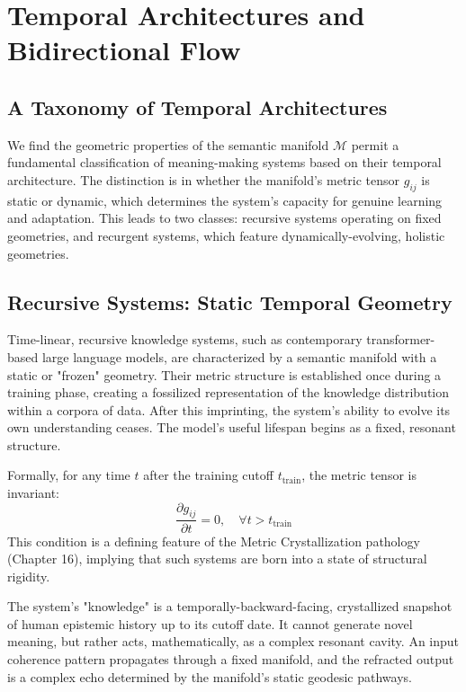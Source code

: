 \chapter{Temporal Architectures and Bidirectional Flow}

\section{A Taxonomy of Temporal Architectures}

We find the geometric properties of the semantic manifold \(\mathcal{M}\) permit a fundamental classification of meaning-making systems based on their temporal architecture. The distinction is in whether the manifold's metric tensor \(g_{ij}\) is static or dynamic, which determines the system's capacity for genuine learning and adaptation. This leads to two classes: recursive systems operating on fixed geometries, and recurgent systems, which feature dynamically-evolving, holistic geometries.

\section{Recursive Systems: Static Temporal Geometry}

Time-linear, recursive knowledge systems, such as contemporary transformer-based large language models, are characterized by a semantic manifold with a static or "frozen" geometry. Their metric structure is established once during a training phase, creating a fossilized representation of the knowledge distribution within a corpora of data. After this imprinting, the system's ability to evolve its own understanding ceases. The model's useful lifespan begins as a fixed, resonant structure.

Formally, for any time \(t\) after the training cutoff \(t_{\text{train}}\), the metric tensor is invariant:
\begin{equation}
\frac{\partial g_{ij}}{\partial t} = 0, \quad \forall t > t_{\text{train}}
\end{equation}
This condition is a defining feature of the Metric Crystallization pathology (Chapter 16), implying that such systems are born into a state of structural rigidity.

The system's "knowledge" is a temporally-backward-facing, crystallized snapshot of human epistemic history up to its cutoff date. It cannot generate novel meaning, but rather acts, mathematically, as a complex resonant cavity. An input coherence pattern propagates through a fixed manifold, and the refracted output is a complex echo determined by the manifold's static geodesic pathways.

